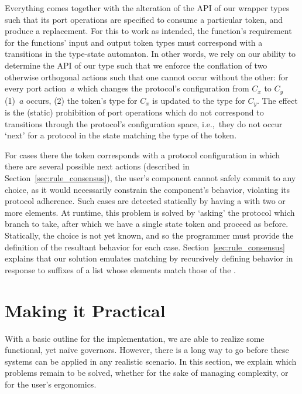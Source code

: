 Everything comes together with the alteration of the API of our wrapper types such that its port operations are specified to consume a particular token, and produce a replacement. For this to work as intended, the function's requirement for the functions' input and output token types must correspond with a transitions in the type-state automaton. In other words, we rely on our ability to determine the API of our  type such that we enforce the conflation of two otherwise orthogonal actions such that one cannot occur without the other: for every port action~$a$ which changes the protocol's configuration from $C_x$ to $C_y$ (1)~$a$ occurs, (2) the token's type for $C_x$ is updated to the type for $C_y$. The effect is the (static) prohibition of port operations which do not correspond to transitions through the protocol's configuration space, i.e.,\ they do not occur `next' for a protocol in the state matching the type of the token. 

For cases there the token corresponds with a protocol configuration in which there are several possible next actions (described in Section~\ref{sec:rule_consensus}), the user's component cannot safely commit to any choice, as it would necessarily constrain the component's behavior, violating its protocol adherence. Such cases are detected statically by having a  with two or more elements. At runtime, this problem is solved by `asking' the protocol which branch to take, after which we have a single state token and proceed as before. Statically, the choice is not yet known, and so the programmer must provide the definition of the resultant behavior for each case. Section~\ref{sec:rule_consensus} explains that our solution emulates matching by recursively defining behavior in response to suffixes of a list whose elements match those of the .

\section{Making it Practical}
\label{sec:making_it_practical}
With a basic outline for the implementation, we are able to realize some functional, yet na\"ive governors. However, there is a long way to go before these systems can be applied in any realistic scenario. In this section, we explain which problems remain to be solved, whether for the sake of managing complexity, or for the user's ergonomics.

